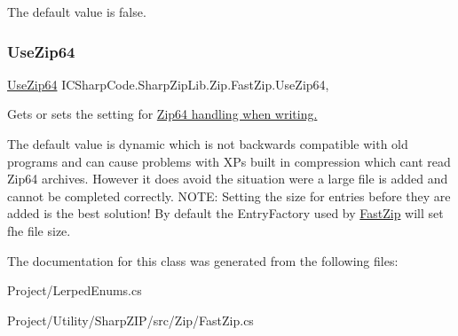 The default value is false.\mbox{\label{class_i_c_sharp_code_1_1_sharp_zip_lib_1_1_zip_1_1_fast_zip_ac4e6307152ee6e83426c8844d9ef89ee}} 
\subsubsection{\texorpdfstring{Use\+Zip64}{UseZip64}}
{\footnotesize\ttfamily \hyperlink{namespace_i_c_sharp_code_1_1_sharp_zip_lib_1_1_zip_aaa66f18625e7ce19069972caf7bc69a0}{Use\+Zip64} I\+C\+Sharp\+Code.\+Sharp\+Zip\+Lib.\+Zip.\+Fast\+Zip.\+Use\+Zip64\hspace{0.3cm}{\ttfamily [get]}, {\ttfamily [set]}}



Gets or sets the setting for \hyperlink{class_i_c_sharp_code_1_1_sharp_zip_lib_1_1_zip_1_1_fast_zip_ac4e6307152ee6e83426c8844d9ef89ee}{Zip64 handling when writing.} 

The default value is dynamic which is not backwards compatible with old programs and can cause problems with XP\textquotesingle{}s built in compression which cant read Zip64 archives. However it does avoid the situation were a large file is added and cannot be completed correctly. N\+O\+TE\+: Setting the size for entries before they are added is the best solution! By default the Entry\+Factory used by \hyperlink{class_i_c_sharp_code_1_1_sharp_zip_lib_1_1_zip_1_1_fast_zip}{Fast\+Zip} will set fhe file size. 

The documentation for this class was generated from the following files\+:\begin{DoxyCompactItemize}
\item 
Project/Lerped\+Enums.\+cs\item 
Project/\+Utility/\+Sharp\+Z\+I\+P/src/\+Zip/Fast\+Zip.\+cs\end{DoxyCompactItemize}
